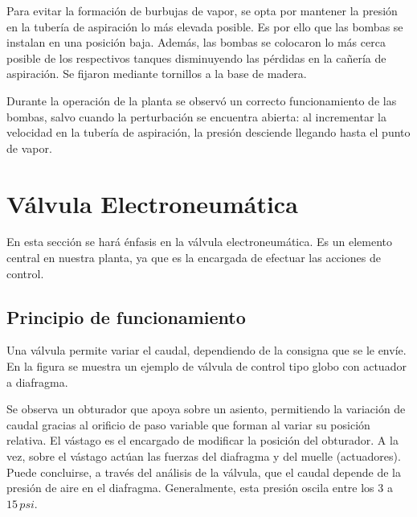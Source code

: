 Para evitar la formación de burbujas de vapor, se opta por mantener la presión
en la tubería de aspiración lo más elevada posible.
Es por ello que las bombas se instalan en una posición baja.
Además, las bombas se colocaron lo más cerca posible de los respectivos
tanques disminuyendo las pérdidas en la cañería de aspiración.
Se fijaron mediante tornillos a la base de madera.

Durante la operación de la planta se observó un correcto funcionamiento de las
bombas, salvo cuando la perturbación se encuentra abierta: al incrementar la
velocidad en la tubería de aspiración, la presión desciende llegando hasta el
punto de vapor.

\section{Válvula Electroneumática}
\label{sec:ValvulaNeumatica}

En esta sección se hará énfasis en la válvula electroneumática.
Es un elemento central en nuestra planta, ya que es la encargada de efectuar
las acciones de control.

\subsection{Principio de funcionamiento}
\label{subsec:principioFuncionamiento}
Una válvula permite variar el caudal, dependiendo de la consigna que se
le envíe.
En la figura  se muestra un ejemplo de válvula de control
tipo globo con actuador a diafragma.

Se observa un obturador que apoya sobre un asiento, permitiendo la variación de
caudal gracias al orificio de paso variable que forman al variar su posición
relativa.
El vástago es el encargado de modificar la posición del obturador.
A la vez, sobre el vástago actúan las fuerzas del diafragma y del muelle
(actuadores).
Puede concluirse, a través del análisis de la válvula, que el caudal depende de
la presión de aire en el diafragma.
Generalmente, esta presión oscila entre los $3$ a $15\,psi$.

